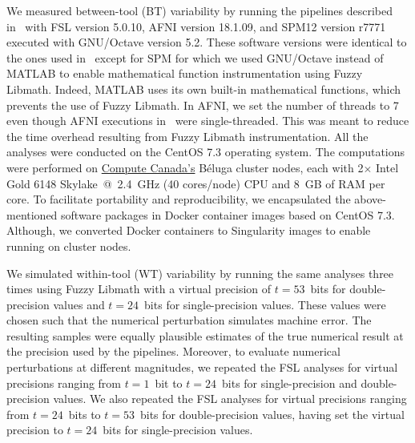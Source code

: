 \documentclass[11pt,onecolumn]{article}
\begin{document}
We measured between-tool (BT) variability by running the pipelines
described in~\cite{bowring2019exploring} with FSL version 5.0.10, AFNI
version 18.1.09, and SPM12 version r7771 executed with GNU/Octave version
5.2. These software versions were identical to the ones used 
in~\cite{bowring2019exploring} except for SPM for which we used GNU/Octave
instead of MATLAB to enable mathematical function instrumentation using
Fuzzy Libmath. Indeed, MATLAB uses its own built-in mathematical functions,
which prevents the use of Fuzzy Libmath. In AFNI, we set the number of
threads to 7 even though AFNI executions
in~\cite{bowring2019exploring} were single-threaded. This was meant to
reduce the time overhead resulting from Fuzzy Libmath instrumentation.
All the analyses were conducted on the CentOS 7.3 operating system. The
computations were performed on \href{https://www.computecanada.ca}{Compute
  Canada's} Béluga cluster nodes, each with 2$\times$ Intel Gold 6148 Skylake~@~2.4~GHz
(40 cores/node) CPU and 8~GB of RAM per core. To facilitate portability and reproducibility,
we encapsulated the
above-mentioned software packages in Docker container images based on CentOS 7.3.
Although, we converted Docker containers to Singularity images to enable running on cluster nodes.

We simulated within-tool (WT) variability by running the same analyses three
times using Fuzzy Libmath with a virtual precision of $t=53$~bits for
double-precision values and $t=24$~bits for single-precision values. These
values were chosen such that the numerical perturbation simulates machine
error. The resulting samples were equally plausible estimates of
the true
numerical result at the precision used by the pipelines. Moreover, to evaluate numerical perturbations at different magnitudes,
we repeated the FSL analyses for virtual
precisions ranging from $t=1$~bit to $t=24$~bits for single-precision
and double-precision values. We also repeated the FSL analyses for virtual
precisions ranging from $t=24$~bits to $t=53$~bits for double-precision values, having
set the virtual precision to $t=24$~bits for single-precision values.
\end{document}
